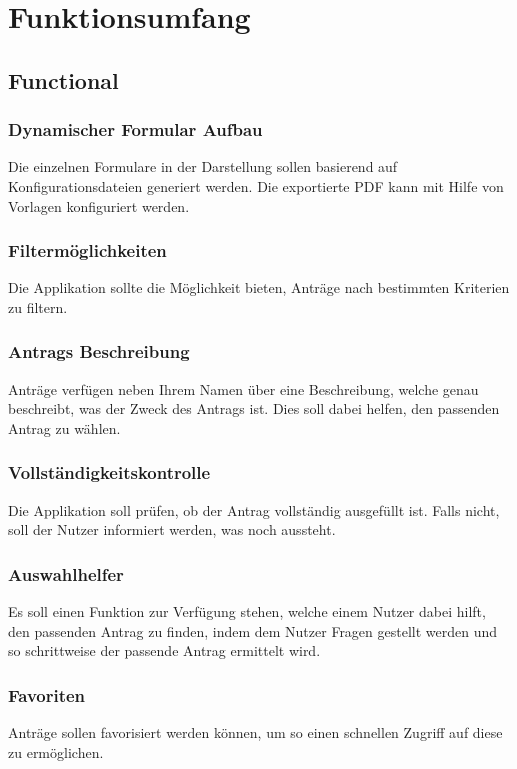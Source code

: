 \chapter{Funktionsumfang}\label{ch:funktionsumfang}

\section{Functional}\label{sec:functional}
\subsection{Dynamischer Formular Aufbau}\label{subsec:dynamischer-formular-aufbau}
Die einzelnen Formulare in der Darstellung sollen basierend auf Konfigurationsdateien generiert werden.
Die exportierte \ac{PDF} kann mit Hilfe von Vorlagen konfiguriert werden.
\subsection{Filtermöglichkeiten}\label{subsec:filtermoglichkeiten}
Die Applikation sollte die Möglichkeit bieten, Anträge nach bestimmten Kriterien zu filtern.
\subsection{Antrags Beschreibung}\label{subsec:antrags-beschreibung}
Anträge verfügen neben Ihrem Namen über eine Beschreibung, welche genau beschreibt, was der Zweck des Antrags ist.
Dies soll dabei helfen, den passenden Antrag zu wählen.
\subsection{Vollständigkeitskontrolle}\label{subsec:vollstandigkeitskontrolle}
Die Applikation soll prüfen, ob der Antrag vollständig ausgefüllt ist.
Falls nicht, soll der Nutzer informiert werden, was noch aussteht.
\subsection{Auswahlhelfer}\label{subsec:auswahls-helfer}
Es soll einen Funktion zur Verfügung stehen, welche einem Nutzer dabei hilft,
den passenden Antrag zu finden, indem dem Nutzer Fragen gestellt werden und so schrittweise der passende Antrag ermittelt wird.
\subsection{Favoriten}\label{subsec:favoriten}
Anträge sollen favorisiert werden können, um so einen schnellen Zugriff auf diese zu ermöglichen.

